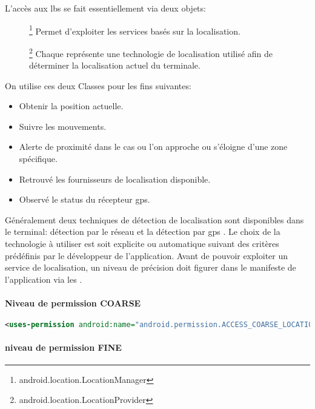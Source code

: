 L'accès aux \gls{lbs} se fait essentiellement via deux objets:
\begin{description}
\item []\footnote{android.location.LocationManager} Permet d'exploiter les services basés sur la localisation.
\item []\footnote{android.location.LocationProvider} Chaque  représente une technologie de localisation utilisé afin de déterminer la localisation actuel du terminale.

\end{description}
On utilise ces deux Classes pour les fins suivantes:
\begin{itemize}
\item Obtenir la position actuelle.
\item Suivre les mouvements.
\item Alerte de proximité dans le cas ou l'on approche ou s’éloigne d'une zone spécifique.
\item Retrouvé les fournisseurs de localisation disponible.
\item Observé le status du récepteur \gls{gps}.
\end{itemize}

Généralement deux techniques de détection de localisation sont disponibles dans le terminal: détection par le réseau  et la détection par \gls{gps} . Le choix de la technologie à utiliser est soit explicite ou automatique suivant des critères prédéfinis par le développeur de l'application. Avant de pouvoir exploiter un service de localisation, un niveau de précision doit figurer dans le manifeste de l'application via les  .

\paragraph{Niveau de permission \textbf{COARSE} } %
\label{par:coarse}

\begin{lstlisting}[language=xml, caption=Permission pour la localisation par le réseau.]
<uses-permission android:name="android.permission.ACCESS_COARSE_LOCATION"/>
\end{lstlisting}

\paragraph{niveau de permission \textbf{FINE} } %
\label{par:fine}

